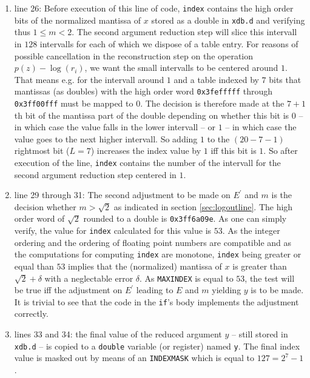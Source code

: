 {\begin{enumerate}
Rewriting {\tt xdb.i[HI] = index | 0x3ff00000} means setting the exponent of {\tt xdb} to $0$ because 
{\tt 0x3ff}$ - 1023 = 0$. 
\item line 26: Before execution of this line of code, {\tt index} contains the high order bits of the normalized mantissa
of $x$ stored as a double in {\tt xdb.d} and verifying thus $1 \leq m < 2$. The second argument reduction step
will slice this intervall in $128$ intervalls for each of which we dispose of a table entry. For reasons of possible 
cancellation in the reconstruction step on the operation $p\left( z \right) - \log\left( r_i \right)$, we want the 
small intervalls to be centered around $1$. That means e.g. for the intervall around $1$ and a table indexed by $7$ bits
that mantissas (as doubles) with the high order word {\tt 0x3fefffff} through {\tt 0x3ff00fff} must be mapped to $0$.
The decision is therefore made at the $7+1$th bit of the mantissa part of the double depending on whether this bit is $0$ 
-- in which case the value falls in the lower intervall -- or $1$ -- in which case the value goes to the next higher 
intervall. So adding $1$ to the $\left(20 - 7 - 1\right)$ rightmost bit ($L = 7$) increases the index value by $1$ iff this bit is $1$.
So after execution of the line, {\tt index} contains the number of the intervall for the second argument reduction step 
centered in $1$.
\item line 29 through 31: The second adjustment to be made on $E^\prime$ and $m$ is the decision whether $m > \sqrt{2}$ as
indicated in section \ref{sec:logoutline}. The high order word of $\sqrt{2}$ rounded to a double is {\tt 0x3ff6a09e}.
As one can simply verify, the value for {\tt index} calculated for this value is $53$. As the integer ordering and 
the ordering of floating point numbers are compatible and as the computations for computing {\tt index} are monotone,
{\tt index} being greater or equal than $53$ implies that the (normalized) mantissa of $x$ is greater than 
$\sqrt{2} + \delta$ with a neglectable error $\delta$. 
As {\tt MAXINDEX} is equal to $53$, the test will be true iff the adjustment on $E^\prime$ leading
to $E$ and $m$ yielding $y$ is to be made. It is trivial to see that the code in the {\tt if}'s body implements the
adjustment correctly.
\item lines 33 and 34: the final value of the reduced argument $y$ -- still stored in {\tt xdb.d} -- is copied to 
a {\tt double} variable (or register) named {\tt y}. The final index value is masked out by means of an {\tt INDEXMASK}
which is equal to $127 = 2^7-1$.

\end{enumerate}}
